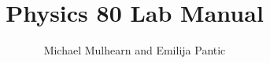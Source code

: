 \documentclass[12pt,oneside]{book}
\theoremstyle{definition}
\begin{document}

\title{Physics 80 Lab Manual}
\author{Michael Mulhearn and Emilija Pantic}
\maketitle








%
%
%
%
%
%
%
\end{document}
